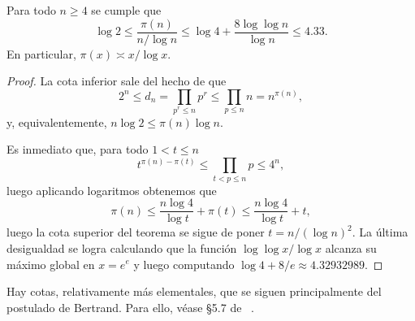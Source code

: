 \documentclass[teoria-numeros.tex]{subfiles}
\begin{document}
\begin{thm}
	Para todo $n \ge 4$ se cumple que
	$$ \log 2 \le \frac{\pi(n)}{n/\log n} \le \log 4 + \frac{8\log\log n}{\log n} \le 4.33. $$
	En particular, $\pi(x) \asymp x/\log x$.
\end{thm}
\begin{proof}
	La cota inferior sale del hecho de que
	$$ 2^n \le d_n = \prod_{p^r \le n} p^r \le \prod_{p \le n} n = n^{\pi(n)}, $$
	y, equivalentemente, $n\log 2 \le \pi(n)\log n$.

	Es inmediato que, para todo $1 < t \le n$
	$$ t^{\pi(n) - \pi(t)} \le \prod_{t < p \le n} p \le 4^n, $$
	luego aplicando logaritmos obtenemos que
	$$ \pi(n) \le \frac{n\log 4}{\log t} + \pi(t) \le \frac{n\log 4}{\log t} + t, $$
	luego la cota superior del teorema se sigue de poner $t = n/(\log n)^2$.
	La última desigualdad se logra calculando que la función $\log\log x/\log x$ alcanza su máximo global en $x = e^e$
	y luego computando $\log 4 + 8/e \approx 4.32932989$.
\end{proof}
Hay cotas, relativamente más elementales, que se siguen principalmente del postulado de Bertrand.
Para ello, véase \S 5.7 de \citeauthor{hua:number}~\cite[79-85]{hua:number}.



\end{document}
